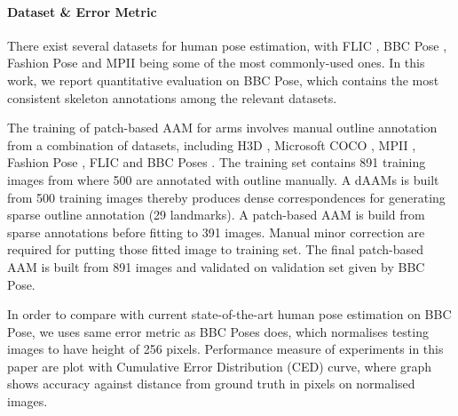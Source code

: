 \paragraph{Dataset \& Error Metric} There exist several datasets for human pose estimation, with FLIC \cite{sapp2013modec}, BBC Pose \cite{pfister2015flowing}, Fashion Pose \cite{dantone2013human} and MPII \cite{andriluka14cvpr} being some of the most commonly-used ones. In this work, we report quantitative evaluation on BBC Pose, which contains the most consistent skeleton annotations among the relevant datasets.


The training of patch-based AAM for arms involves manual outline annotation from a combination of datasets, including H3D \cite{PoseletsICCV09}, Microsoft COCO \cite{lin2014microsoft}, MPII \cite{andriluka14cvpr}, Fashion Pose \cite{dantone2013human}, FLIC \cite{sapp2013modec} and BBC Poses \cite{pfister2015flowing}. The training set contains 891 training images from where 500 are annotated with outline manually. A dAAMs is built from 500 training images thereby produces dense correspondences for generating sparse outline annotation (29 landmarks). A patch-based AAM is build from sparse annotations before fitting to 391 images. Manual minor correction are required for putting those fitted image to training set. The final patch-based AAM is built from 891 images and validated on validation set given by BBC Pose.

In order to compare with current state-of-the-art human pose estimation on BBC Pose, we uses same error metric as BBC Poses does, which normalises testing images to have height of 256 pixels. Performance measure of experiments in this paper are plot with Cumulative Error Distribution (CED) curve, where graph shows accuracy against distance from ground truth in pixels on normalised images.


